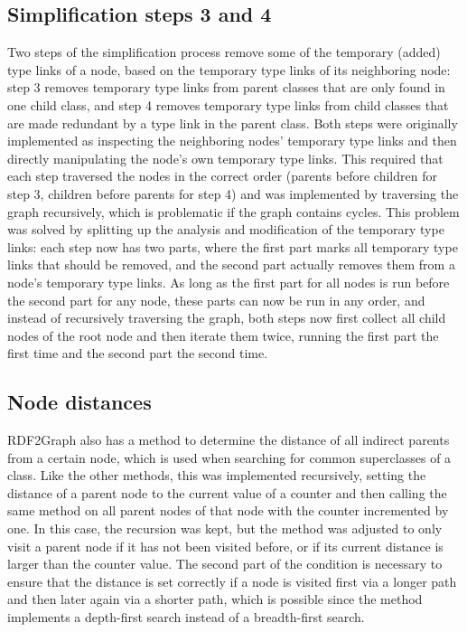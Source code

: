 \subsection{Simplification steps 3 and 4}
\label{subsec:RDF2Graph+Wikidata:cyclic-graphs:simplify-step-3+4}

Two steps of the simplification process
remove some of the temporary (added) type links of a node,
based on the temporary type links of its neighboring node:
step 3 removes temporary type links from parent classes that are only found in one child class,
and step 4 removes temporary type links from child classes that are made redundant by a type link in the parent class.
Both steps were originally implemented as inspecting the neighboring nodes’ temporary type links
and then directly manipulating the node’s own temporary type links.
This required that each step traversed the nodes in the correct order
(parents before children for step 3,
children before parents for step 4)
and was implemented by traversing the graph recursively,
which is problematic if the graph contains cycles.
This problem was solved by splitting up the analysis and modification of the temporary type links:
each step now has two parts,
where the first part marks all temporary type links that should be removed,
and the second part actually removes them from a node’s temporary type links.
As long as the first part for all nodes is run before the second part for any node,
these parts can now be run in any order,
and instead of recursively traversing the graph,
both steps now first collect all child nodes of the root node
and then iterate them twice,
running the first part the first time and the second part the second time.

\subsection{Node distances}
\label{subsec:RDF2Graph+Wikidata:cyclic-graph:distance}

\Gls{RDF2Graph} also has a method to determine the distance of all indirect parents from a certain node,
which is used when searching for common superclasses of a class.
Like the other methods, this was implemented recursively,
setting the distance of a parent node to the current value of a counter
and then calling the same method on all parent nodes of that node with the counter incremented by one.
In this case, the recursion was kept,
but the method was adjusted to only visit a parent node
if it has not been visited before, or if its current distance is larger than the counter value.
The second part of the condition is necessary to ensure that the distance is set correctly
if a node is visited first via a longer path and then later again via a shorter path,
which is possible since the method implements a depth-first search instead of a breadth-first search.


